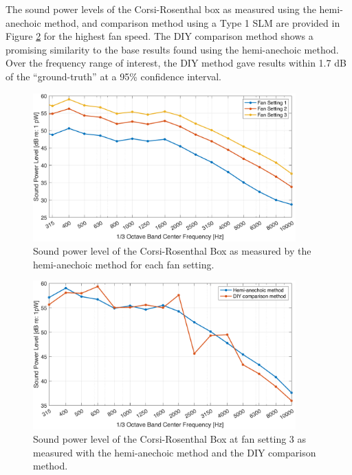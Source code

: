 \documentclass[letterpaper,12pt]{article}
\begin{document}
The sound power levels of the Corsi-Rosenthal box as measured using the hemi-anechoic method, and comparison method using a Type 1 SLM are provided in Figure \ref{fig:comparisonfan3} for the highest fan speed. The DIY comparison method shows a promising similarity to the base results found using the hemi-anechoic method. Over the frequency range of interest, the DIY method gave results within 1.7 dB of the ``ground-truth'' at a 95\% confidence interval.   
\begin{figure}[h!]
    \centering
    \includegraphics[width=0.9\textwidth]{manuscript/fig/CorsiLwHemiAnech.pdf}
    \caption{Sound power level of the Corsi-Rosenthal Box as measured by the hemi-anechoic method for each fan setting.}
    \label{fig:GroundTruth}
\end{figure}

\begin{figure}[h!]
     \centering
        \includegraphics[width=0.9\textwidth]{manuscript/fig/VacComparison.pdf}
          \caption{Sound power level of the Corsi-Rosenthal Box at fan setting 3 as measured with the hemi-anechoic method and the DIY comparison method.}
        \label{fig:comparisonfan3}
\end{figure}
\end{document}
